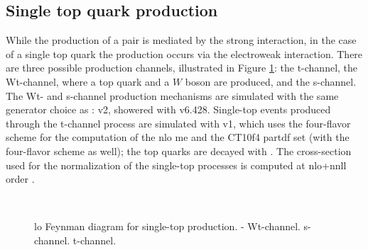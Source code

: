 \subsection{Single top quark production}

While the production of a \ttbar pair is mediated by the strong interaction, in the case of a single top quark the production occurs via the electroweak interaction. 
There are three possible production channels, illustrated in Figure \ref{fig:single_top_prod}: the t-channel, the Wt-channel, where a top quark and a $W$ boson are produced, and the s-channel. 
The Wt- and s-channel production mechanisms are simulated with the same generator choice as \ttbar: \PowhegBox v2, showered with \PY v6.428.
Single-top events produced through the t-channel process are simulated with \PowhegBox v1, which uses the four-flavor scheme for the computation of the \gls{nlo} \gls{me} and the CT10f4 \gls{partdf} set (with the four-flavor scheme as well); 
the top quarks are decayed with \MadSpin \cite{Artoisenet:2012st}.
The cross-section used for the normalization of the single-top processes is computed at \gls{nlo}+\gls{nnll} order 
\cite{Kidonakis:2011wy,Kidonakis:2010ux,Kidonakis:2010tc}.

\begin{figure}[h]
\centering 
{}
 \\
\caption{\Gls{lo} Feynman diagram for single-top production. - Wt-channel. 
 s-channel.  t-channel.}\label{fig:single_top_prod}
\end{figure}

